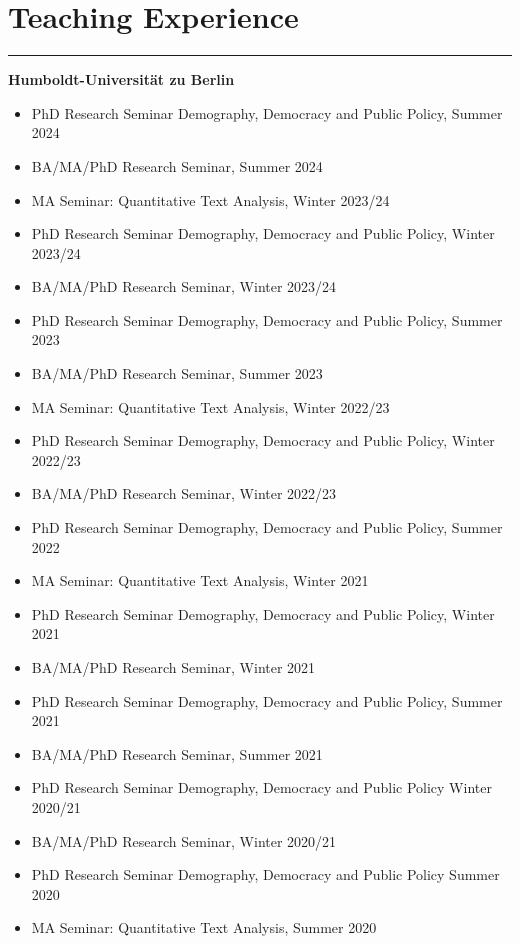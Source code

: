 \section*{Teaching Experience}\vspace{-2em}\rule{\textwidth}{0.5pt}\vspace{1em}
\textbf{Humboldt-Universität zu Berlin}
\begin{itemize}[topsep=0pt, noitemsep, leftmargin=3]
	\item PhD Research Seminar Demography, Democracy and Public Policy, Summer 2024
	\item BA/MA/PhD Research Seminar, Summer 2024
	\item MA Seminar: Quantitative Text Analysis, Winter 2023/24
	\item PhD Research Seminar Demography, Democracy and Public Policy, Winter 2023/24
	\item BA/MA/PhD Research Seminar, Winter 2023/24
	\item PhD Research Seminar Demography, Democracy and Public Policy, Summer 2023
	\item BA/MA/PhD Research Seminar, Summer 2023
	\item MA Seminar: Quantitative Text Analysis, Winter 2022/23
	\item PhD Research Seminar Demography, Democracy and Public Policy, Winter 2022/23
	\item BA/MA/PhD Research Seminar, Winter 2022/23
	\item PhD Research Seminar Demography, Democracy and Public Policy, Summer 2022
	\item MA Seminar: Quantitative Text Analysis, Winter 2021
	\item PhD Research Seminar Demography, Democracy and Public Policy, Winter 2021
	\item BA/MA/PhD Research Seminar, Winter 2021
	\item PhD Research Seminar Demography, Democracy and Public Policy, Summer 2021
	\item BA/MA/PhD Research Seminar, Summer 2021
	\item PhD Research Seminar Demography, Democracy and Public Policy Winter 2020/21
	\item BA/MA/PhD Research Seminar, Winter 2020/21
	\item PhD Research Seminar Demography, Democracy and Public Policy  Summer 2020
	\item MA Seminar: Quantitative Text Analysis, Summer 2020

\end{itemize}
